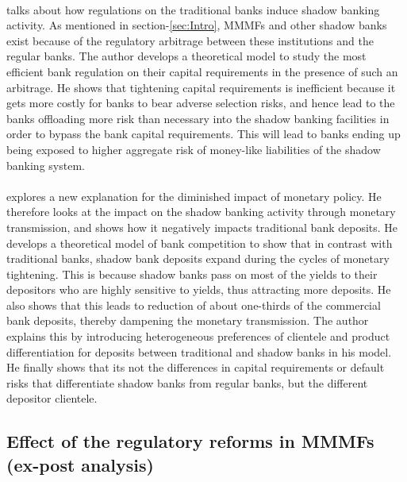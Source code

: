 \documentclass[11pt]{article}
\begin{document}
\paragraph{} \cite{plantin2015shadow} talks about how regulations on the traditional banks induce shadow banking activity. As mentioned in section-\ref{sec:Intro}, MMMFs and other shadow banks exist because of the regulatory arbitrage between these institutions and the regular banks. The author develops a theoretical model to study the most efficient bank regulation on their capital requirements in the presence of such an arbitrage. He shows that tightening capital requirements is inefficient because it gets more costly for banks to bear adverse selection risks, and hence lead to the banks offloading more risk than necessary into the shadow banking facilities in order to bypass the bank capital requirements. This will lead to banks ending up being exposed to higher aggregate risk of money-like liabilities of the shadow banking system.  

\paragraph{} \cite{xiao2020monetary} explores a new explanation for the diminished impact of monetary policy. He therefore looks at the impact on the shadow banking activity through monetary transmission, and shows how it negatively impacts traditional bank deposits. He develops a theoretical model of bank competition to show that in contrast with traditional banks, shadow bank deposits expand during the cycles of monetary tightening. This is because shadow banks pass on most of the yields to their depositors who are highly sensitive to yields, thus attracting more deposits. He also shows that this leads to reduction of about one-thirds of the commercial bank deposits, thereby dampening the monetary transmission. The author explains this by introducing heterogeneous preferences of clientele and product differentiation for deposits between traditional and shadow banks in his model. He finally shows that its not the differences in capital requirements or default risks that differentiate shadow banks from regular banks, but the different depositor clientele.

\subsection{Effect of the regulatory reforms in MMMFs (ex-post analysis)}
\end{document}
